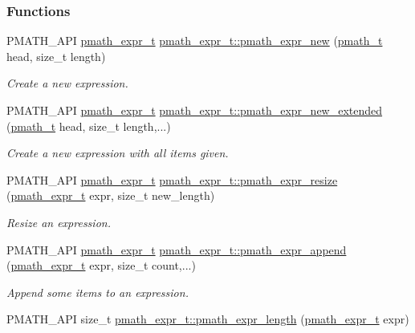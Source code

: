 \subsubsection*{Functions}
\begin{CompactItemize}
\item 
PMATH\_\-API \hyperlink{classpmath__expr__t}{pmath\_\-expr\_\-t} \hyperlink{group__expressions_ga830588c2d0d6e28e78dfe6838f9935f}{pmath\_\-expr\_\-t::pmath\_\-expr\_\-new} (\hyperlink{classpmath__t}{pmath\_\-t} head, size\_\-t length)
\begin{CompactList}\small\item\em Create a new expression. \item\end{CompactList}\item 
PMATH\_\-API \hyperlink{classpmath__expr__t}{pmath\_\-expr\_\-t} \hyperlink{group__expressions_ge2fc3e2cc7db617208f2ef97deed49d7}{pmath\_\-expr\_\-t::pmath\_\-expr\_\-new\_\-extended} (\hyperlink{classpmath__t}{pmath\_\-t} head, size\_\-t length,...)
\begin{CompactList}\small\item\em Create a new expression with all items given. \item\end{CompactList}\item 
PMATH\_\-API \hyperlink{classpmath__expr__t}{pmath\_\-expr\_\-t} \hyperlink{group__expressions_g781924a3e0164cc27e703b486517ab4c}{pmath\_\-expr\_\-t::pmath\_\-expr\_\-resize} (\hyperlink{classpmath__expr__t}{pmath\_\-expr\_\-t} expr, size\_\-t new\_\-length)
\begin{CompactList}\small\item\em Resize an expression. \item\end{CompactList}\item 
PMATH\_\-API \hyperlink{classpmath__expr__t}{pmath\_\-expr\_\-t} \hyperlink{group__expressions_g8057092ab059876cd19e09c2ff7296d9}{pmath\_\-expr\_\-t::pmath\_\-expr\_\-append} (\hyperlink{classpmath__expr__t}{pmath\_\-expr\_\-t} expr, size\_\-t count,...)
\begin{CompactList}\small\item\em Append some items to an expression. \item\end{CompactList}\item 
PMATH\_\-API size\_\-t \hyperlink{group__expressions_gf77c0a198380cd9b3e7e1a47f41f57c0}{pmath\_\-expr\_\-t::pmath\_\-expr\_\-length} (\hyperlink{classpmath__expr__t}{pmath\_\-expr\_\-t} expr)

\end{CompactItemize}
